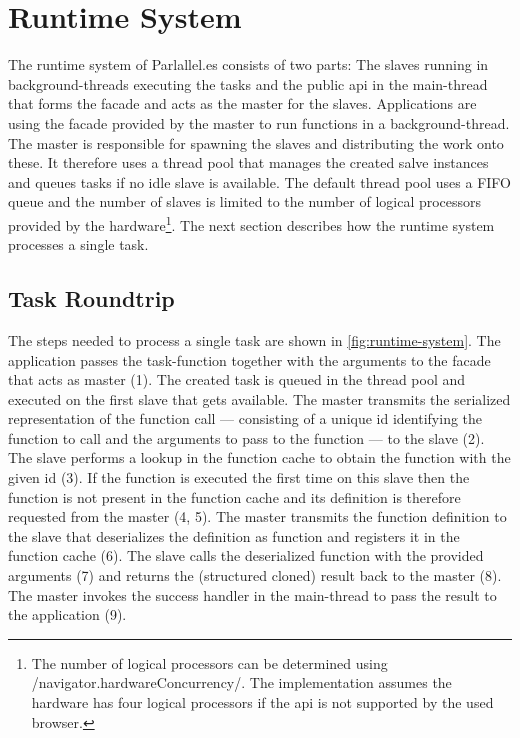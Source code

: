 \section{Runtime System}\label{sec:runtime-system}
The runtime system of Parlallel.es consists of two parts: The slaves running in background-threads executing the tasks and the public api in the main-thread that forms the facade and acts as the master for the slaves. Applications are using the facade provided by the master to run functions in a background-thread. The master is responsible for spawning the slaves and distributing the work onto these. It therefore uses a thread pool that manages the created salve instances and queues tasks if no idle slave is available. The default thread pool uses a FIFO queue and the number of slaves is limited to the number of logical processors provided by the hardware\footnote{The number of logical processors can be determined using \javascriptinline/navigator.hardwareConcurrency/. The implementation assumes the hardware has four logical processors if the api is not supported by the used browser.}. The next section describes how the runtime system processes a single task. 

\subsection{Task Roundtrip}
The steps needed to process a single task are shown in \cref{fig:runtime-system}. The application passes the task-function together with the arguments to the facade that acts as master (1). The created task is queued in the thread pool and executed on the first slave that gets available. The master transmits the serialized representation of the function call --- consisting of a unique id identifying the function to call and the arguments to pass to the function --- to the slave (2). The slave performs a lookup in the function cache to obtain the function with the given id (3). If the function is executed the first time on this slave then the function is not present in the function cache and its definition is therefore requested from the master (4, 5). The master transmits the function definition to the slave that deserializes the definition as function and registers it in the function cache (6). The slave calls the deserialized function with the provided arguments (7) and returns the (structured cloned) result back to the master (8). The master invokes the success handler in the main-thread to pass the result to the application (9). 

